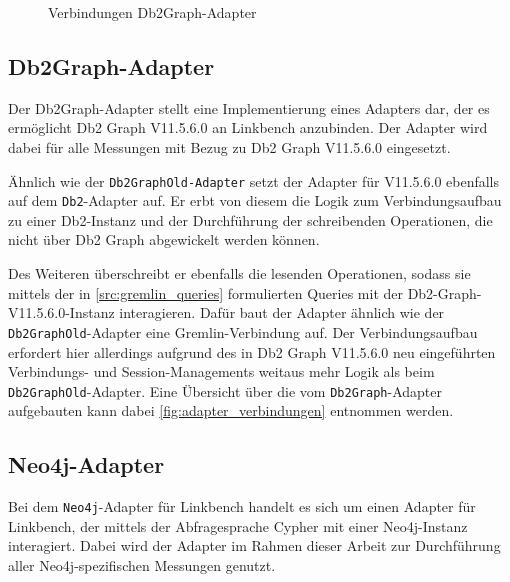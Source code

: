 \begin{figure}[!ht]
    \centering
    \caption{Verbindungen Db2Graph-Adapter}
    \label{fig:adapter_verbindungen}
\end{figure}

\subsection{Db2Graph-Adapter}
\label{implementierung:adapter:db2graph:ga}
Der Db2Graph-Adapter stellt eine Implementierung eines Adapters dar, der es ermöglicht Db2 Graph V11.5.6.0 an Linkbench anzubinden. Der Adapter wird dabei für alle Messungen mit Bezug zu Db2 Graph V11.5.6.0 eingesetzt. 

Ähnlich wie der \texttt{Db2GraphOld-Adapter} setzt der Adapter für V11.5.6.0 ebenfalls auf dem \texttt{Db2}-Adapter auf. Er erbt von diesem die Logik zum Verbindungsaufbau zu einer Db2-Instanz und der Durchführung der schreibenden Operationen, die nicht über Db2 Graph abgewickelt werden können. 

Des Weiteren überschreibt er ebenfalls die lesenden Operationen, sodass sie mittels der in \autoref{src:gremlin_queries} formulierten Queries mit der Db2-Graph-V11.5.6.0-Instanz interagieren. Dafür baut der Adapter ähnlich wie der \texttt{Db2Graph\allowbreak Old}-Adapter eine Gremlin-Verbindung auf. Der Verbindungsaufbau erfordert hier allerdings aufgrund des in Db2 Graph V11.5.6.0 neu eingeführten Verbindungs- und Session-Managements weitaus mehr Logik als beim \texttt{Db2GraphOld}-Adapter. Eine Übersicht über die vom \texttt{Db2Graph}-Adapter aufgebauten kann dabei \autoref{fig:adapter_verbindungen} entnommen werden.

\subsection{Neo4j-Adapter}
\label{implementierung:adapter:neo4j}
Bei dem \texttt{Neo4j}-Adapter für Linkbench handelt es sich um einen Adapter für Linkbench, der mittels der Abfragesprache Cypher mit einer Neo4j-Instanz interagiert. Dabei wird der Adapter im Rahmen dieser Arbeit zur Durchführung aller Neo4j-spezifischen Messungen genutzt. 

